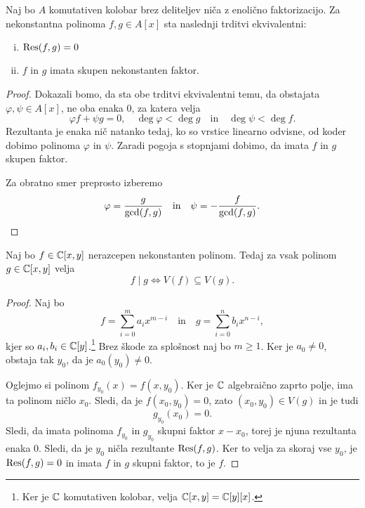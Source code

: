 \begin{izrek}
Naj bo $A$ komutativen kolobar brez deliteljev niča z enolično
faktorizacijo. Za nekonstantna polinoma $f, g \in A[x]$ sta
naslednji trditvi ekvivalentni:

\begin{enumerate}[i)]
\item $\operatorname{Res}(f,g) = 0$
\item $f$ in $g$ imata skupen nekonstanten faktor.
\end{enumerate}
\end{izrek}

\begin{proof}
Dokazali bomo, da sta obe trditvi ekvivalentni temu, da obstajata
$\varphi, \psi \in A[x]$, ne oba enaka $0$, za katera velja
\[
\varphi f + \psi g = 0,
\quad
\deg \varphi < \deg g
\quad \text{in} \quad
\deg \psi < \deg f.
\]
Rezultanta je enaka nič natanko tedaj, ko so vrstice linearno
odvisne, od koder dobimo polinoma $\varphi$ in $\psi$. Zaradi
pogoja s stopnjami dobimo, da imata $f$ in $g$ skupen faktor.

Za obratno smer preprosto izberemo
\[
\varphi = \frac{g}{\gcd(f,g)}
\quad \text{in} \quad
\psi = -\frac{f}{\gcd(f,g)}. \qedhere
\]
\end{proof}

\begin{lema}[Study]
Naj bo $f \in \mathbb{C}[x,y]$ nerazcepen nekonstanten polinom. Tedaj za
vsak polinom $g \in \mathbb{C}[x,y]$ velja
\[
f \mid g \iff V(f) \subseteq V(g).
\]
\end{lema}

\begin{proof}
Naj bo
\[
f = \sum_{i=0}^m a_i x^{m-i}
\quad \text{in} \quad
g = \sum_{i=0}^n b_i x^{n-i},
\]
kjer so $a_i, b_i \in \mathbb{C}[y]$.\footnote{Ker je $\mathbb{C}$ komutativen
kolobar, velja $\mathbb{C}[x,y] = \mathbb{C}[y][x]$.} Brez škode za splošnost naj
bo $m \geq 1$. Ker je $a_0 \ne 0$, obstaja tak $y_0$, da je
$a_0(y_0) \ne 0$.

Oglejmo si polinom $f_{y_0}(x) = f(x,y_0)$. Ker je $\mathbb{C}$ algebraično
zaprto polje, ima ta polinom ničlo $x_0$. Sledi, da je
$f(x_0, y_0) = 0$, zato $(x_0, y_0) \in V(g)$ in je tudi
\[
g_{y_0}(x_0) = 0.
\]
Sledi, da imata polinoma $f_{y_0}$ in $g_{y_0}$ skupni faktor
$x - x_0$, torej je njuna rezultanta enaka $0$. Sledi, da je $y_0$
ničla rezultante $\operatorname{Res}(f,g)$. Ker to velja za skoraj vse $y_0$, je
$\operatorname{Res}(f,g) = 0$ in imata $f$ in $g$ skupni faktor, to je $f$.
\end{proof}

